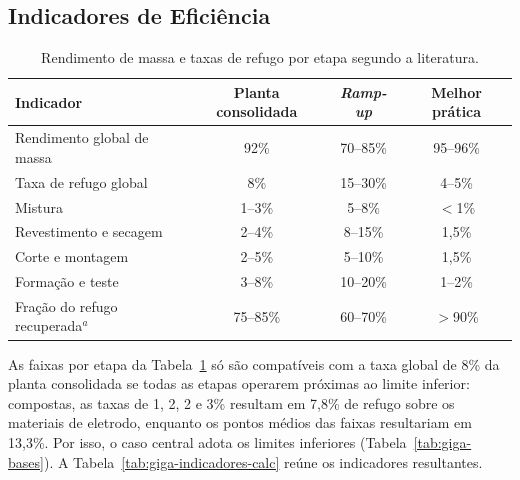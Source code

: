 \subsection{Indicadores de Eficiência}
\label{subsec:giga-indicadores}

\begin{table}[H]
\centering
\caption{Rendimento de massa e taxas de refugo por etapa segundo a literatura.}
\label{tab:giga-rendimento}
\small
\renewcommand{\arraystretch}{1.15}
\begin{tabular}{@{} l c c c @{}}
\toprule
\textbf{Indicador} & \textbf{Planta consolidada} & \textbf{\textit{Ramp-up}} & \textbf{Melhor prática} \\
\midrule
Rendimento global de massa & 92\% & 70--85\% & 95--96\% \\
Taxa de refugo global & 8\% & 15--30\% & 4--5\% \\
\quad Mistura & 1--3\% & 5--8\% & $<$1\% \\
\quad Revestimento e secagem & 2--4\% & 8--15\% & 1,5\% \\
\quad Corte e montagem & 2--5\% & 5--10\% & 1,5\% \\
\quad Formação e teste & 3--8\% & 10--20\% & 1--2\% \\
Fração do refugo recuperada$^{a}$ & 75--85\% & 60--70\% & $>$90\% \\
\bottomrule
\end{tabular}
\par{}
\end{table}

As faixas por etapa da Tabela~\ref{tab:giga-rendimento} só são compatíveis com a
taxa global de 8\% da planta consolidada se todas as etapas operarem próximas ao
limite inferior: compostas, as taxas de 1, 2, 2 e 3\% resultam em 7,8\% de refugo
sobre os materiais de eletrodo, enquanto os pontos médios das faixas resultariam
em 13,3\%. Por isso, o caso central adota os limites inferiores
(Tabela~\ref{tab:giga-bases}). A Tabela~\ref{tab:giga-indicadores-calc} reúne os
indicadores resultantes.


